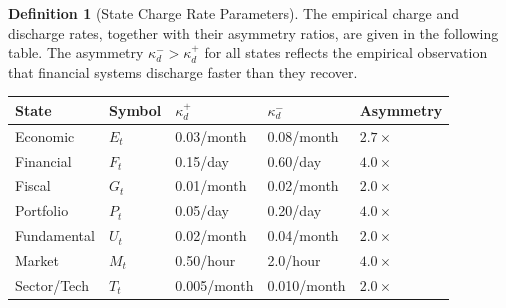 \documentclass[12pt,openany]{book}
\newcommand{\calE}{\mathcal{E}}
\newcommand{\calF}{\mathcal{F}}
\newcommand{\calG}{\mathcal{G}}
\newcommand{\calP}{\mathcal{P}}
\newcommand{\calU}{\mathcal{U}}
\newcommand{\calM}{\mathcal{M}}
\newcommand{\calT}{\mathcal{T}}
\numberwithin{equation}{chapter}
\theoremstyle{plain}
\theoremstyle{definition}
\newtheorem{definition}[theorem]{Definition}
\theoremstyle{remark}
\def\mathcal#1{#1}%
\begin{document}
\begin{definition}[State Charge Rate Parameters]
\label{def:charge-rates}
The empirical charge and discharge rates, together with their
asymmetry ratios, are given in the following table.  The
asymmetry $\kappa_d^{-} > \kappa_d^{+}$ for all states reflects
the empirical observation that financial systems discharge faster
than they recover.

\begin{center}
\begin{tabularx}{\textwidth}{@{} l l l l l @{}}
\toprule
\textbf{State} & \textbf{Symbol} & \textbf{$\kappa_d^{+}$}
  & \textbf{$\kappa_d^{-}$} & \textbf{Asymmetry} \\
\midrule
Economic & $\calE_t$ & 0.03/month & 0.08/month & $2.7\times$ \\
Financial & $\calF_t$ & 0.15/day & 0.60/day & $4.0\times$ \\
Fiscal & $\calG_t$ & 0.01/month & 0.02/month & $2.0\times$ \\
Portfolio & $\calP_t$ & 0.05/day & 0.20/day & $4.0\times$ \\
Fundamental & $\calU_t$ & 0.02/month & 0.04/month & $2.0\times$ \\
Market & $\calM_t$ & 0.50/hour & 2.0/hour & $4.0\times$ \\
Sector/Tech & $\calT_t$ & 0.005/month & 0.010/month & $2.0\times$ \\
\bottomrule
\end{tabularx}
\end{center}
\end{definition}
\end{document}

